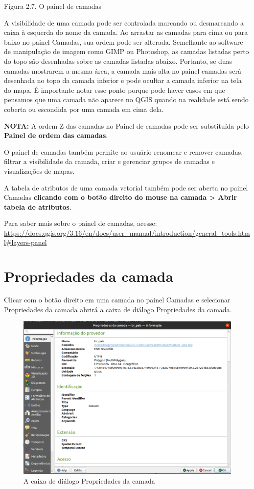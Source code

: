 \documentclass[
]{krantz}
\begin{document}
Figura 2.7. O painel de camadas

A visibilidade de uma camada pode ser controlada marcando ou desmarcando a caixa à esquerda do nome da camada. Ao arrastar as camadas para cima ou para baixo no painel Camadas, sua ordem pode ser alterada. Semelhante ao software de manipulação de imagem como GIMP ou Photoshop, as camadas listadas perto do topo são desenhadas sobre as camadas listadas abaixo. Portanto, se duas camadas mostrarem a mesma área, a camada mais alta no painel camadas será desenhada no topo da camada inferior e pode ocultar a camada inferior na tela do mapa. É importante notar esse ponto porque pode haver casos em que pensamos que uma camada não aparece no QGIS quando na realidade está sendo coberta ou escondida por uma camada em cima dela.

\textbf{NOTA:} A ordem Z das camadas no Painel de camadas pode ser substituída pelo \textbf{Painel de ordem das camadas}.

O painel de camadas também permite ao usuário renomear e remover camadas, filtrar a visibilidade da camada, criar e gerenciar grupos de camadas e visualizações de mapas.

A tabela de atributos de uma camada vetorial também pode ser aberta no painel Camadas \textbf{clicando com o botão direito do mouse na camada \textgreater{} Abrir tabela de atributos}.

Para saber mais sobre o painel de camadas, acesse: \href{https://docs.qgis.org\%20/3.16/en/docs/user_manual/introduction/general_tools.html\#layers-panel}{https://docs.qgis.org/3.16/en/docs/user\_manual/introduction/general\_tools.html\#layers-panel}

\hypertarget{propriedades-da-camada}{%
\section{Propriedades da camada}\label{propriedades-da-camada}}

Clicar com o botão direito em uma camada no painel Camadas e selecionar Propriedades da camada abrirá a caixa de diálogo Propriedades da camada.

\begin{figure}
\centering
\includegraphics{media/modulo2/layer-properties.png}
\caption{A caixa de diálogo Propriedades da camada}
\end{figure}
\end{document}
